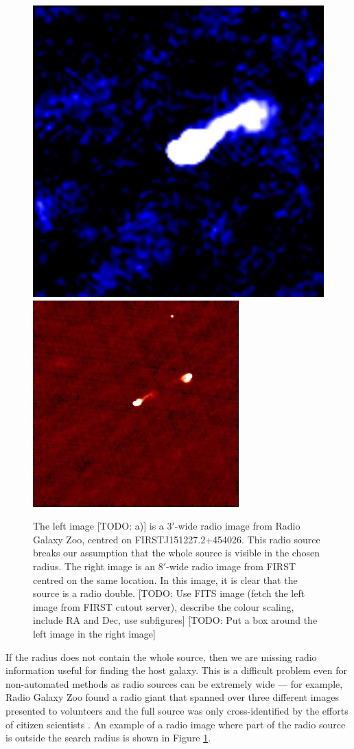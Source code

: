 \documentclass[fleqn,usenatbib,usedcolumn]{mnras}
\begin{document}
    \begin{figure}
      \centering
      \includegraphics[width=0.45\linewidth]{images/ARG0000u0h_radio.jpg}
      \includegraphics[width=0.45\linewidth]{images/ARG0000u0h_first.jpg}
      \caption{The left image [TODO: a)] is a $3'$-wide radio image from Radio Galaxy
        Zoo, centred on FIRSTJ151227.2+454026. This radio source
        breaks our assumption that the whole source is visible in the chosen
        radius. The right image is an $8'$-wide radio image from FIRST centred
        on the same location. In this image, it is clear that the source is a
        radio double. [TODO: Use FITS image (fetch the left image from FIRST
        cutout server), describe the colour scaling, include RA and Dec, use
        subfigures] [TODO: Put a box around the left image in the right image]}
      \label{fig:broken-contains}
    \end{figure}

    If the radius does not contain the whole source, then we are missing radio
    information useful for finding the host galaxy. This is a difficult
    problem even for non-automated methods as radio sources can be extremely
    wide --- for example, Radio Galaxy Zoo found a radio giant that spanned
    over three different images presented to volunteers and the full source
    was only cross-identified by the efforts of citizen scientists
    \citep{banfield15}. An example of a radio image where part of the radio
    source is outside the search radius is shown in Figure
    \ref{fig:broken-contains}.
\end{document}
